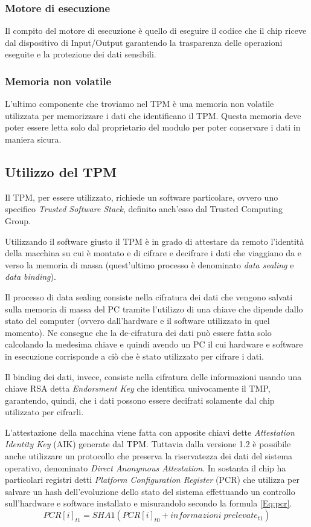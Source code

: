 \subsubsection{Motore di esecuzione}
Il compito del motore di esecuzione è quello di eseguire il codice che il chip riceve dal dispositivo di Input/Output garantendo la trasparenza delle operazioni eseguite e la protezione dei dati sensibili.

\subsubsection{Memoria non volatile}
L'ultimo componente che troviamo nel TPM è una memoria non volatile utilizzata per memorizzare i dati che identificano il TPM. Questa memoria deve poter essere letta solo dal proprietario del modulo per poter conservare i dati in maniera sicura.

\subsection{Utilizzo del TPM}
Il TPM, per essere utilizzato, richiede un software particolare, ovvero uno specifico \textit{Trusted Software Stack}, definito anch'esso dal Trusted Computing Group.

Utilizzando il software giusto il TPM è in grado di attestare da remoto l'identità della macchina su cui è montato e di cifrare e decifrare i dati che viaggiano da e verso la memoria di massa (quest'ultimo processo è denominato \textit{data sealing} e \textit{data binding}).

Il processo di data sealing consiste nella cifratura dei dati che vengono salvati sulla memoria di massa del PC tramite l'utilizzo di una chiave che dipende dallo stato del computer (ovvero dall'hardware e il software utilizzato in quel momento). Ne consegue che la de-cifratura dei dati può essere fatta solo calcolando la medesima chiave e quindi avendo un PC il cui hardware e software in esecuzione corrisponde a ciò che è stato utilizzato per cifrare i dati.

Il binding dei dati, invece, consiste nella cifratura delle informazioni usando una chiave RSA detta \textit{Endorsment Key} che identifica univocamente il TMP, garantendo, quindi, che i dati possono essere decifrati solamente dal chip utilizzato per cifrarli.

L'attestazione della macchina viene fatta con apposite chiavi dette \textit{Attestation Identity Key} (AIK) generate dal TPM. Tuttavia dalla versione 1.2 è possibile anche utilizzare un protocollo che preserva la riservatezza dei dati del sistema operativo, denominato \textit{Direct Anonymous Attestation}. In sostanta il chip ha particolari registri detti \textit{Platform Configuration Register} (PCR) che utilizza per salvare un hash dell'evoluzione dello stato del sistema effettuando un controllo sull'hardware e software installato e misurandolo secondo la formula \ref{Eq:pcr}.
    \begin{equation}
   	PCR[i]_{t1} = SHA1(PCR[i]_{t0} + informazioni\; prelevate_{t1})
    	\label{Eq:pcr}
    \end{equation}
    
